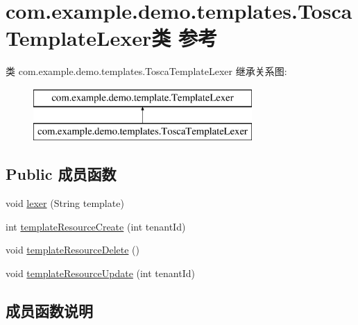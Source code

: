 \hypertarget{classcom_1_1example_1_1demo_1_1templates_1_1_tosca_template_lexer}{}\section{com.\+example.\+demo.\+templates.\+Tosca\+Template\+Lexer类 参考}
\label{classcom_1_1example_1_1demo_1_1templates_1_1_tosca_template_lexer}
类 com.\+example.\+demo.\+templates.\+Tosca\+Template\+Lexer 继承关系图\+:\begin{figure}[H]
\begin{center}
\leavevmode
\includegraphics[height=2.000000cm]{classcom_1_1example_1_1demo_1_1templates_1_1_tosca_template_lexer}
\end{center}
\end{figure}
\subsection*{Public 成员函数}
\begin{DoxyCompactItemize}
\item 
void \mbox{\hyperlink{classcom_1_1example_1_1demo_1_1templates_1_1_tosca_template_lexer_af453b08a7efd5b0b33bcdf8ff085af84}{lexer}} (String template)
\item 
int \mbox{\hyperlink{classcom_1_1example_1_1demo_1_1templates_1_1_tosca_template_lexer_a47a9186303228b682b6276712c8fa9cb}{template\+Resource\+Create}} (int tenant\+Id)
\item 
void \mbox{\hyperlink{classcom_1_1example_1_1demo_1_1templates_1_1_tosca_template_lexer_abe09d1bfc27e36f03e72859030538179}{template\+Resource\+Delete}} ()
\item 
void \mbox{\hyperlink{classcom_1_1example_1_1demo_1_1templates_1_1_tosca_template_lexer_aba212807a46b286b34d8f7984532186f}{template\+Resource\+Update}} (int tenant\+Id)
\end{DoxyCompactItemize}


\subsection{成员函数说明}
\mbox{\label{classcom_1_1example_1_1demo_1_1templates_1_1_tosca_template_lexer_af453b08a7efd5b0b33bcdf8ff085af84}} 
